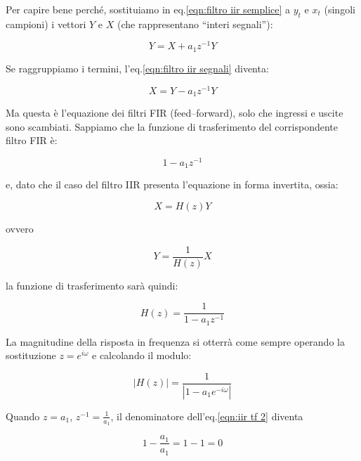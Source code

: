 Per capire bene perch\'e, sostituiamo in eq.\ref{eqn:filtro iir semplice} a $y_t$ e $x_t$ (singoli campioni) i
vettori $Y$ e $X$ (che rappresentano ``interi segnali''):

  \begin{equation}\label{eqn:filtro iir segnali}
		Y = X + a_1 z^{-1} Y
	\end{equation}

	Se raggruppiamo i termini, l'eq.\ref{eqn:filtro iir segnali} diventa:

  \begin{equation}\label{eqn:filtro iir segnali raggruppata}
		X = Y - a_1 z^{-1} Y
	\end{equation}

Ma questa \`e l'equazione dei filtri FIR (feed--forward), solo che ingressi e
uscite sono scambiati. Sappiamo che la funzione di trasferimento del
corrispondente filtro FIR \`e:

	\begin{equation}
		1 - a_1 z^{-1}
	\end{equation}

e, dato che il caso del filtro IIR presenta l'equazione in forma invertita,
ossia:

	\begin{equation}
		X = H(z) Y
	\end{equation}

ovvero

	\begin{equation}
		Y = \frac{1}{H(z)} X
	\end{equation}

la funzione di trasferimento sar\`a quindi:

	\begin{equation}\label{eqn:iir tf}
		H(z) = \frac{1}{1 - a_1 z^{-1}}
	\end{equation}

La magnitudine della risposta in frequenza si otterr\`a come sempre
operando la sostituzione $z = e^{i\omega}$ e calcolando il modulo:

	\begin{equation}\label{eqn:iir tf 2}
		|H(z)| = \frac{1}{|1 - a_1 e^{-i\omega}|}
	\end{equation}

Quando $z = a_1$, $z^{-1} = \frac{1}{a_1}$, il denominatore
dell'eq.\ref{eqn:iir tf 2} diventa

	\begin{equation}\label{eqn:iir tf zero condition}
		1 - \frac{a_1}{a_1} = 1 - 1 = 0
	\end{equation}

